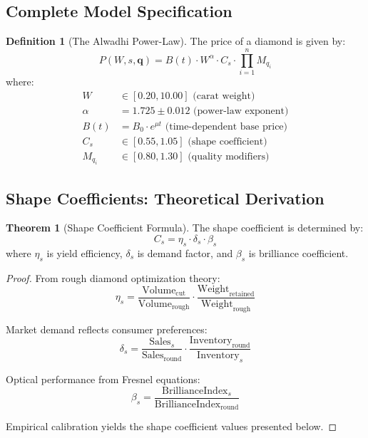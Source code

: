 \documentclass[12pt,a4paper]{article}
\theoremstyle{definition}
\newtheorem{definition}{Definition}
\newtheorem{theorem}{Theorem}
\theoremstyle{remark}
\begin{document}
\subsection{Complete Model Specification}

\begin{definition}[The Alwadhi Power-Law]
The price of a diamond is given by:
\begin{equation}
P(W, s, \mathbf{q}) = B(t) \cdot W^{\alpha} \cdot C_s \cdot \prod_{i=1}^{n} M_{q_i}
\label{eq:complete_model}
\end{equation}
where:
\begin{align}
W &\in [0.20, 10.00] \text{ (carat weight)} \\
\alpha &= 1.725 \pm 0.012 \text{ (power-law exponent)} \\
B(t) &= B_0 \cdot e^{\mu t} \text{ (time-dependent base price)} \\
C_s &\in [0.55, 1.05] \text{ (shape coefficient)} \\
M_{q_i} &\in [0.80, 1.30] \text{ (quality modifiers)}
\end{align}
\end{definition}

\subsection{Shape Coefficients: Theoretical Derivation}

\begin{theorem}[Shape Coefficient Formula]
The shape coefficient is determined by:
\begin{equation}
C_s = \eta_s \cdot \delta_s \cdot \beta_s
\label{eq:shape_coef}
\end{equation}
where $\eta_s$ is yield efficiency, $\delta_s$ is demand factor, and $\beta_s$ is brilliance coefficient.
\end{theorem}

\begin{proof}
From rough diamond optimization theory:
\begin{equation}
\eta_s = \frac{\text{Volume}_{\text{cut}}}{\text{Volume}_{\text{rough}}} \cdot \frac{\text{Weight}_{\text{retained}}}{\text{Weight}_{\text{rough}}}
\end{equation}

Market demand reflects consumer preferences:
\begin{equation}
\delta_s = \frac{\text{Sales}_s}{\text{Sales}_{\text{round}}} \cdot \frac{\text{Inventory}_{\text{round}}}{\text{Inventory}_s}
\end{equation}

Optical performance from Fresnel equations:
\begin{equation}
\beta_s = \frac{\text{BrillianceIndex}_s}{\text{BrillianceIndex}_{\text{round}}}
\end{equation}

Empirical calibration yields the shape coefficient values presented below.

\end{proof}
\end{document}
